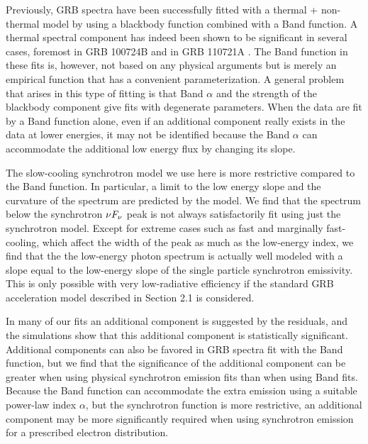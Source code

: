 Previously, GRB spectra have been successfully fitted with a thermal +
non-thermal model by using a blackbody function combined with a Band
function. A thermal spectral component has indeed been shown to be
significant in several cases, foremost in GRB 100724B and in GRB
110721A \cite{Guiriec:2011,Axelsson:2012}. The Band function in these
fits is, however, not based on any physical arguments but is merely an
empirical function that has a convenient parameterization. A general
problem that arises in this type of fitting is that Band $\alpha$ and
the strength of the blackbody component give fits with degenerate
parameters. When the data are fit by a Band function alone, even if an
additional component really exists in the data at lower energies, it
may not be identified because the Band $\alpha$ can accommodate the
additional low energy flux by changing its slope.

The slow-cooling synchrotron model we use here is more restrictive
compared to the Band function. In particular, a limit to the low
energy slope and the curvature of the spectrum are predicted by the
model.  We find that the spectrum below the synchrotron $\nu F_{\nu}$ peak is
not always satisfactorily fit using just the synchrotron model. Except
for extreme cases such as fast and marginally fast-cooling, which
affect the width of the peak as much as the low-energy index, we find
that the the low-energy photon spectrum is actually well modeled with
a slope equal to the low-energy slope of the single particle
synchrotron emissivity. This is only possible with very low-radiative
efficiency if the standard GRB acceleration model described in Section
2.1 is considered.


In many of our fits an additional component is suggested by the
residuals, and the simulations show that this additional component is
statistically significant. Additional components can also be favored
in GRB spectra fit with the Band function, but we find that the
significance of the additional component can be greater when using
physical synchrotron emission fits than when using Band fits. Because
the Band function can accommodate the extra emission using a suitable
power-law index $\alpha$, but the synchrotron function is more
restrictive, an additional component may be more significantly
required when using synchrotron emission for a prescribed electron
distribution.



